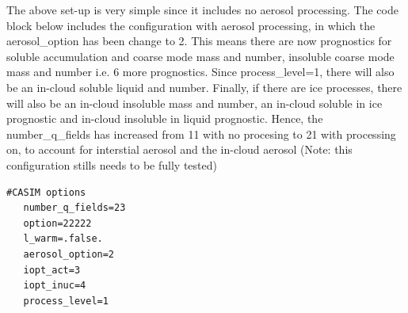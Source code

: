 \documentclass[a4paper,11pt]{article}
\begin{document}
The above set-up is very simple since it includes no aerosol processing. The code
block below includes the configuration with aerosol processing, in which
the aerosol\_option has been change to 2. This means there are now prognostics
for soluble accumulation and coarse mode mass and number, insoluble coarse mode
mass and number i.e. 6 more prognostics. Since process\_level=1, there will also
be an in-cloud soluble liquid and number. Finally, if there are ice processes,
there will also be an in-cloud insoluble mass and number, an in-cloud soluble
in ice prognostic and in-cloud insoluble in liquid prognostic. Hence, the
number\_q\_fields has increased from 11 with no procesing to 21 with processing
on, to account for interstial aerosol and the in-cloud aerosol (Note: this
configuration stills needs to be fully tested)
\begin{lstlisting}[caption={Example configuration snippet for CASIM settings.
   with aerosol and processing}]
   #CASIM options
   number_q_fields=23
   option=22222
   l_warm=.false.
   aerosol_option=2
   iopt_act=3
   iopt_inuc=4
   process_level=1
\end{lstlisting}
\end{document}
